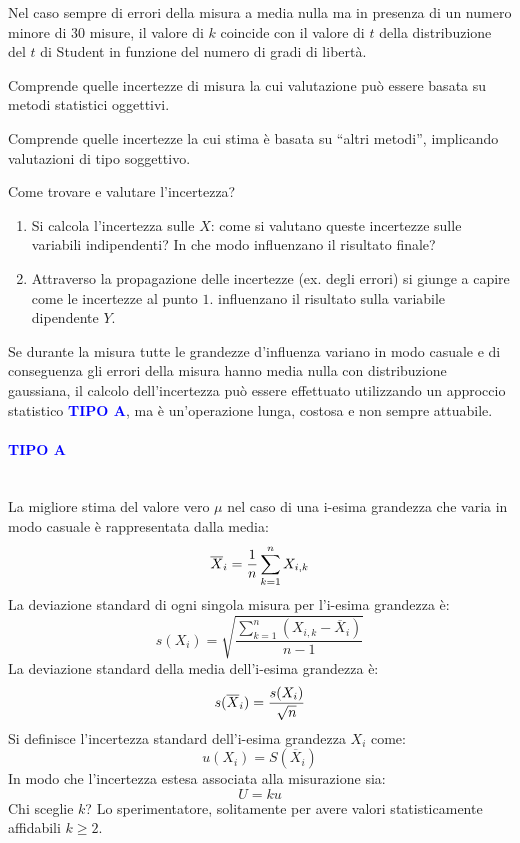 \documentclass[a4paper, 15pt]{article}
\begin{document}
\begin{adjustwidth}{2in}{}
	Nel caso sempre di errori della misura a media nulla ma in presenza di un numero
	minore di 30 misure, il valore di $ k $ coincide con il valore di $ t $ della distribuzione
	del $ t $ di Student in funzione del numero di gradi di libertà. 
	
	\begin{tcolorbox}[colback=blue!5!white,colframe=blue!75!black,title=TIPO A]
		Comprende quelle incertezze di misura la cui valutazione può
		essere basata su metodi statistici oggettivi.
	\end{tcolorbox}

\begin{tcolorbox}[colback=red!5!white,colframe=red!75!black,title=TIPO B]
	Comprende quelle incertezze la cui stima è basata su “altri
	metodi”, implicando valutazioni di tipo soggettivo.
\end{tcolorbox}
\newpage	
	Come trovare e valutare l'incertezza?
	\begin{enumerate}
		\item Si calcola l'incertezza sulle $X$: come si valutano queste incertezze sulle variabili indipendenti? In che modo influenzano il risultato finale?
		\item Attraverso la propagazione delle incertezze (ex. degli errori) si giunge a capire come le incertezze al punto $1.$ influenzano il risultato sulla variabile dipendente $Y$.
	\end{enumerate}	
	Se durante la misura tutte le grandezze d’influenza
	variano in modo casuale e di conseguenza gli errori della misura hanno
	media nulla con distribuzione gaussiana, il calcolo dell’incertezza può essere effettuato
	utilizzando un approccio statistico \textcolor{blue}{\textbf{TIPO A}}, ma è un'operazione lunga, costosa e non sempre attuabile.  	
	\paragraph{\Large \textcolor{blue}{\textbf{TIPO A}}} \mbox{} \\ 
	La migliore stima del valore vero $\mu$ nel caso di una i-esima grandezza che varia in modo casuale è rappresentata dalla media: 
	\[\overline{X}_i = {1\over n}\sum_{k=1}^{n}X_{i,k}\]
	La deviazione standard di ogni singola misura per l'i-esima grandezza è:
	\[s(X_i) = \sqrt{\dfrac{\sum_{k=1}^{n}\left(X_{i,k}-\overline{X}_i\right)}{n-1}}\]
	La deviazione standard della media dell'i-esima grandezza è: 
	\[s(\overline{X}_i) = {s(X_i)\over\sqrt{n}}\]
	Si definisce l'incertezza standard dell'i-esima grandezza $X_i$ come:
	\[u(X_i) = S(\overline{X}_i)\]
	In modo che l'incertezza estesa associata alla misurazione sia:
	\[U=ku\]
	Chi sceglie $k$? Lo sperimentatore, solitamente per avere valori statisticamente affidabili $k\geq2$.  	

\end{adjustwidth}
\end{document}
